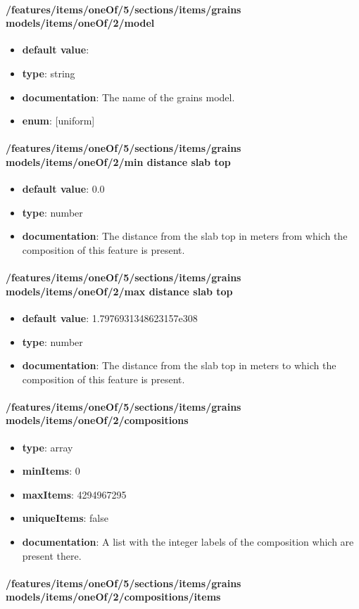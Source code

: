 \paragraph{/features/items/oneOf/5/sections/items/grains models/items/oneOf/2/model}
\begin{itemize}\item {\bf default value}: 
\item {\bf type}: string
\item {\bf documentation}: The name of the grains model.
\item {\bf enum}: [uniform]\end{itemize}\paragraph{/features/items/oneOf/5/sections/items/grains models/items/oneOf/2/min distance slab top}
\begin{itemize}\item {\bf default value}: 0.0
\item {\bf type}: number
\item {\bf documentation}: The distance from the slab top in meters from which the composition of this feature is present.
\end{itemize}\paragraph{/features/items/oneOf/5/sections/items/grains models/items/oneOf/2/max distance slab top}
\begin{itemize}\item {\bf default value}: 1.7976931348623157e308
\item {\bf type}: number
\item {\bf documentation}: The distance from the slab top in meters to which the composition of this feature is present.
\end{itemize}\paragraph{/features/items/oneOf/5/sections/items/grains models/items/oneOf/2/compositions}
\begin{itemize}\item {\bf type}: array
\item {\bf minItems}: 0
\item {\bf maxItems}: 4294967295
\item {\bf uniqueItems}: false
\item {\bf documentation}: A list with the integer labels of the composition which are present there.
\end{itemize}\paragraph{/features/items/oneOf/5/sections/items/grains models/items/oneOf/2/compositions/items}
